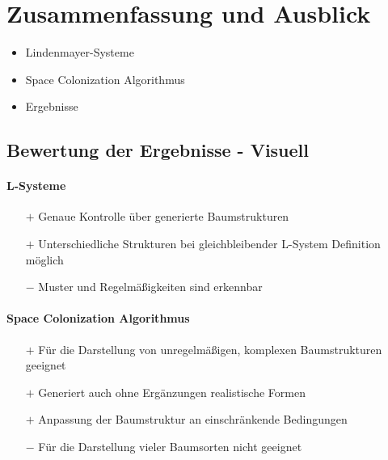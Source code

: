 \newpage
\slidetitle{}
\section{Zusammenfassung und Ausblick \\}


\begin{itemize}
	\item Lindenmayer-Systeme\\
	
	\item Space Colonization Algorithmus\\
	
	\item Ergebnisse
\end{itemize}


\newpage
{}
\subsection{Bewertung der Ergebnisse - Visuell\\}

\paragraph{L-Systeme\\}

\begin{itemize}
	\item[$+$] Genaue Kontrolle über generierte Baumstrukturen\\
	
	\item[$+$] Unterschiedliche Strukturen bei gleichbleibender L-System Definition möglich\\
	
	\item[$-$] Muster und Regelmäßigkeiten sind erkennbar
\end{itemize}




\newpage
\paragraph{Space Colonization Algorithmus\\}

\begin{itemize}
	\item[$+$] Für die Darstellung von unregelmäßigen, komplexen Baumstrukturen geeignet\\
	
	\item[$+$] Generiert auch ohne Ergänzungen realistische Formen\\
	
	\item[$+$] Anpassung der Baumstruktur an einschränkende Bedingungen\\
	
	\item[$-$] Für die Darstellung vieler Baumsorten nicht geeignet\\
\end{itemize}



